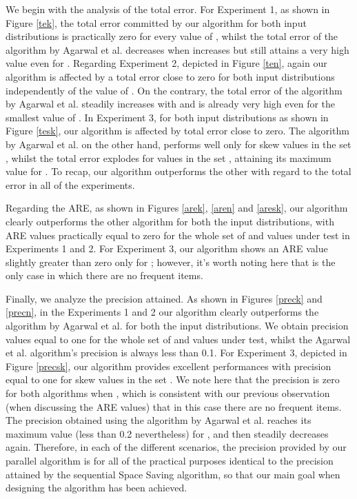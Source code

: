 \documentclass[final,3p,times]{elsarticle}
\begin{document}
 
We begin with the analysis of the total error. For Experiment 1, as shown in Figure \ref{tek}, the total error committed by our algorithm for both input distributions is practically zero for every value of , whilst the total error of the algorithm by Agarwal et al. decreases when  increases but still attains a very high value even for . Regarding Experiment 2, depicted in Figure \ref{ten}, again our algorithm is affected by a total error close to zero for both input distributions independently of the value of . On the contrary, the total error of the algorithm by Agarwal et al. steadily increases with  and is already very high even for the smallest value of . In Experiment 3, for both input distributions as shown in Figure \ref{tesk}, our algorithm is affected by total error close to zero. The algorithm by Agarwal et al. on the other hand, performs well only for skew values in the set , whilst the total error explodes for values in the set , attaining its maximum value for . To recap, our algorithm outperforms the other with regard to the total error in all of the experiments.

Regarding the ARE, as shown in Figures \ref{arek}, \ref{aren} and \ref{aresk}, our algorithm clearly outperforms the other algorithm for both the input distributions, with ARE values practically equal to zero for the whole set of  and  values under test in Experiments 1 and 2. For Experiment 3, our algorithm shows an ARE value slightly greater than zero  only for ; however, it's worth noting here that  is the only case in which there are no frequent items.

Finally, we analyze the precision attained. As shown in Figures \ref{preck} and \ref{precn}, in the Experiments 1 and 2 our algorithm clearly outperforms the algorithm by Agarwal et al. for both the input distributions. We obtain precision values equal to one for the whole set of  and  values under test, whilst the Agarwal et al. algorithm's precision is always less than 0.1. For Experiment 3, depicted in Figure  \ref{precsk}, our algorithm provides excellent performances with precision equal to one for skew values in the set  .  We note here that the precision is zero for both algorithms when , which is consistent with our previous observation (when discussing the ARE values) that in this case there are no frequent items. The precision obtained using the algorithm by Agarwal et al. reaches its maximum value (less than 0.2 nevertheless) for , and then steadily decreases again. Therefore, in each of the different scenarios, the precision provided by our parallel algorithm is for all of the practical purposes identical to the precision attained by the sequential Space Saving algorithm, so that our main goal when designing the algorithm has been achieved.
\end{document}
